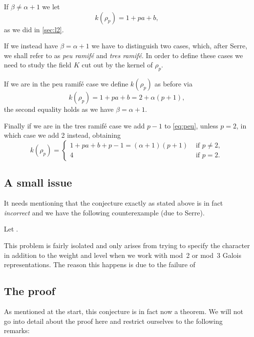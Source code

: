 \documentclass[a4paper,12pt]{article}
\begin{document}
If $\beta \ne \alpha + 1$ we let
\begin{equation}\label{eq:l1nt}
k(\rho_p) = 1 + pa + b,
\end{equation}
as we did in \cref{sec:l2}.

If we instead have $\beta = \alpha + 1$ we have to distinguish two cases, which, after Serre, we shall refer to as \emph{peu ramif\'e} and \emph{tres ramif\'e}.
In order to define these cases we need to study the field $K$ cut out by the kernel of $\rho_p$.

If we are in the peu ramif\'e case we define $k(\rho_p)$ as before via
\begin{equation}\label{eq:peu}
k(\rho_p) = 1 + pa + b = 2 + \alpha(p+1),
\end{equation}
the second equality holds as we have $\beta = \alpha + 1$.

Finally if we are in the tres ramif\'e case we add $p-1$ to \cref{eq:peu}, unless $p=2$, in which case we add 2 instead, obtaining
\begin{equation}\label{eq:tres}
k(\rho_p) = \begin{cases}
1 + pa + b + p - 1 = (\alpha + 1)(p+1) & \text{ if }p\ne 2,\\
4 & \text{ if } p = 2.
\end{cases}
\end{equation}


\subsection{A small issue}
It needs mentioning that the conjecture exactly as stated above is in fact \emph{incorrect} and we have the following counterexample (due to Serre).

\begin{ex}
Let . %
\end{ex}

This problem is fairly isolated and only arises from trying to specify the character in addition to the weight and level when we work with mod~2 or mod~3 Galois representations.
The reason this happens is due to the failure of


\subsection{The proof}
As mentioned at the start, this conjecture is in fact now a theorem.
We will not go into detail about the proof here and restrict ourselves to the following remarks:
\end{document}

